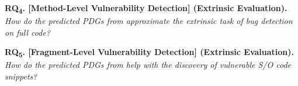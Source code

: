 \vspace{2pt}
\noindent \textbf{RQ\textsubscript{4}. [Method-Level Vulnerability Detection] 
(Extrinsic Evaluation).}  {\em How do the predicted PDGs
    from \tool approximate the extrinsic task of bug detection on full
    code?}

  \vspace{2pt}
\noindent \textbf{RQ\textsubscript{5}. [Fragment-Level Vulnerability Detection] (Extrinsic Evaluation).}  {\em How do
    the predicted PDGs from \tool help with the discovery of vulnerable
    S/O code snippets?}


